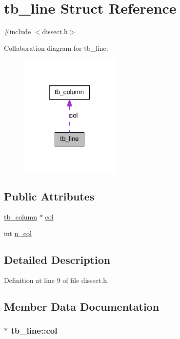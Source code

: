 \hypertarget{structtb__line}{
\section{tb\_\-line Struct Reference}
\label{structtb__line}
}


{\ttfamily \#include $<$dissect.h$>$}



Collaboration diagram for tb\_\-line:\nopagebreak
\begin{figure}[H]
\begin{center}
\leavevmode
\includegraphics[width=142pt]{structtb__line__coll__graph}
\end{center}
\end{figure}
\subsection*{Public Attributes}
\begin{DoxyCompactItemize}
\item 
\hyperlink{structtb__column}{tb\_\-column} $\ast$ \hyperlink{structtb__line_a696513af3da4418db8d49ee318a0055b}{col}
\item 
int \hyperlink{structtb__line_adc05d4116a10f0cd23f22f9be0f7495e}{n\_\-col}
\end{DoxyCompactItemize}


\subsection{Detailed Description}


Definition at line 9 of file dissect.h.



\subsection{Member Data Documentation}
\hypertarget{structtb__line_a696513af3da4418db8d49ee318a0055b}{
\subsubsection[{col}]{ $\ast$ {\bf tb\_\-line::col}}}
\label{structtb__line_a696513af3da4418db8d49ee318a0055b}


